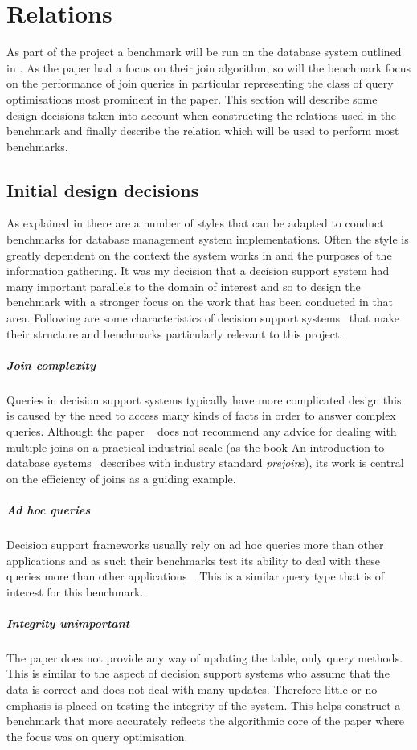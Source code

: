 \section{Relations}
As part of the project a benchmark will be run on the database system outlined
in . As the paper \relalg{} had a focus on their join algorithm, so will the benchmark focus
on the performance of join queries in particular representing the class of query
optimisations most prominent in the paper. This section will describe some design
decisions taken into account when constructing the relations used in the
benchmark and finally describe the  relation which will be
used to perform most benchmarks.

\subsection{Initial design decisions}
As explained in  there are a number of styles that can be adapted to
conduct benchmarks for database management system implementations. Often the
style is greatly dependent on the context the system works in and the purposes
of the information gathering. It was my decision that a decision support system
had many important parallels to the domain of interest and so to design the
benchmark with a stronger focus on the work that has been conducted in that
area. Following are some characteristics of decision support
systems~\cite{IntroToDatabaseSystems}
that make their structure and benchmarks particularly relevant to this
project.

\subparagraph{Join complexity} Queries in decision support systems typically
have more complicated design this is caused by the need to access many
kinds of facts in order to answer complex queries. Although the
paper \relalg{}~\cite{RelationalAlgebraByWayOfAdjunctions}
does not recommend any advice for dealing with multiple joins on a practical
industrial scale (as the book An introduction to database
systems~\cite{IntroToDatabaseSystems} describes with industry
standard \emph{prejoin}s), its work is central on the efficiency of joins as a
guiding example.

\subparagraph{Ad hoc queries} Decision support frameworks usually rely on ad hoc
queries more than other applications and as such their benchmarks test its
ability to deal with these queries more than other applications~\cite{SetQueryBenchmark, PractitionersIntroduction}. This is a similar
query type that is of interest for this benchmark.

\subparagraph{Integrity unimportant} The paper \relalg{} does not provide any way of
updating the table, only query methods. This is similar to the aspect of
decision support systems who assume that the data is correct and
does not deal with many updates. Therefore little or no emphasis is placed on
testing the integrity of the system. This helps construct a benchmark that more
accurately reflects the algorithmic core of the paper where the focus was on
query optimisation.
